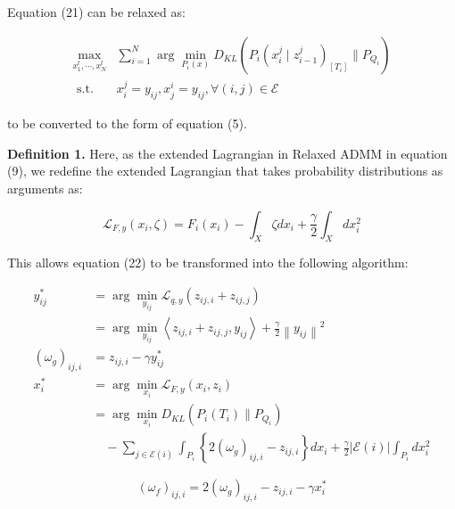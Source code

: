 \documentclass[a4paper,fleqn,10pt,twocolumn]{SICE_ISCS}
\begin{document}
Equation (21) can be relaxed as:

\begin{equation}
\begin{aligned}
\max _{x_{1}^{t}, \cdots, x_{N}^{t}} & \sum_{i=1}^{N} \arg \min _{P_{i}(x)} D_{K L}\left(P_{i}\left(x_{i}^{j} \mid z_{i-1}^{j}\right)_{\left[T_{i}\right]} \| P_{Q_{i}}\right) \\
\text { s.t. } & x_{i}^{j}=y_{i j}, x_{j}^{i}=y_{i j}, \forall(i, j) \in \mathcal{E}
\end{aligned}
\end{equation}

to be converted to the form of equation (5).

\textbf{Definition 1.} Here, as the extended Lagrangian in Relaxed ADMM in equation (9), we redefine the extended Lagrangian that takes probability distributions as arguments as:

\begin{equation}
\mathcal{L}_{F, y}\left(x_{i}, \zeta\right)=F_{i}\left(x_{i}\right)-\int_{X} \zeta d x_{i}+\frac{\gamma}{2} \int_{X} d x_{i}^{2}
\end{equation}

This allows equation (22) to be transformed into the following algorithm:

\begin{equation}
\begin{aligned}
y_{i j}^{*} & =\arg \min _{y_{i j}} \mathcal{L}_{q, y}\left(z_{i j, i}+z_{i j, j}\right) \\
& =\arg \min _{y_{i j}}\left\langle z_{i j, i}+z_{i j, j}, y_{i j}\right\rangle+\frac{\gamma}{2}\left\|y_{i j}\right\|^{2} \\
\left(\omega_{g}\right)_{i j, i} & =z_{i j, i}-\gamma y_{i j}^{*} \\
x_{i}^{*} & =\arg \min _{x_{i}} \mathcal{L}_{F, y}\left(x_{i}, z_{i}\right) \\
& =\arg \min _{x_{i}} D_{K L}\left(P_{i}\left(T_{i}\right) \| P_{Q_{i}}\right) \\
& \quad-\sum_{j \in \mathcal{E}(i)} \int_{P_{i}}\left\{2\left(\omega_{g}\right)_{i j, i}-z_{i j, i}\right\} d x_{i}+\frac{\gamma}{2}|\mathcal{E}(i)| \int_{P_{i}} d x_{i}^{2}
\end{aligned}
\end{equation}

\begin{equation}
\left(\omega_{f}\right)_{i j, i}=2\left(\omega_{g}\right)_{i j, i}-z_{i j, i}-\gamma x_{i}^{*}
\end{equation}
\end{document}

